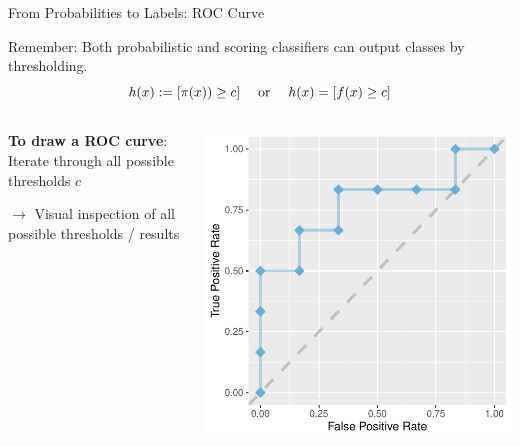 \documentclass[11pt,compress,t,notes=noshow, xcolor=table]{beamer}
\newenvironment{knitrout}{}{} %
\begin{document}
\begin{vbframe}{From Probabilities to Labels: ROC Curve}

Remember: Both probabilistic and scoring classifiers can output classes by thresholding.\\
$$h(x):= [\pi(x)) \ge c] \quad \text{ or } \quad h(x) = [f(x) \ge c]$$

\begin{columns}
\begin{column}{0.45\textwidth}

\textbf{To draw a ROC curve}:\\

Iterate through all possible thresholds $c$

\lz 


$\rightarrow$ Visual inspection of all possible thresholds / results

\end{column}
\begin{column}{0.45\textwidth} 

\begin{knitrout}\scriptsize
{}\color{fgcolor}

{\centering \includegraphics[width=\textwidth]{figure/eval_mclass_roc_sp_4}

}



\end{knitrout}


\end{column}
\end{columns}

\end{vbframe}
\end{document}
